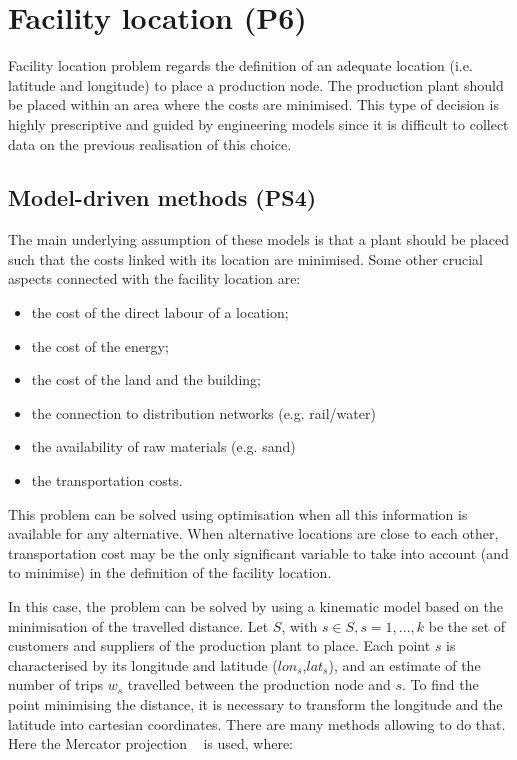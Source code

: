 \section{Facility location (P6)} \label{secFacilityLocationProd}
Facility location problem regards the definition of an adequate location (i.e. latitude and longitude) to place a production node. The production plant should be placed within an area where the costs are minimised. This type of decision is highly prescriptive and guided by engineering models since it is difficult to collect data on the previous realisation of this choice.

\subsection{Model-driven methods (PS4)}
The main underlying assumption of these models is that a plant should be placed such that the costs linked with its location are minimised. Some other crucial aspects connected with the facility location are:

\begin{itemize}
    \item the cost of the direct labour of a location;
    \item the cost of the energy;
    \item the cost of the land and the building;
    \item the connection to distribution networks (e.g. rail/water)
    \item the availability of raw materials (e.g. sand)
    \item the transportation costs.

\end{itemize}

This problem can be solved using optimisation when all this information is available for any alternative. When alternative locations are close to each other, transportation cost may be the only significant variable to take into account (and to minimise) in the definition of the facility location.\par

In this case, the problem can be solved by using a kinematic model based on the minimisation of the travelled distance. Let $S$, with $s\in S, s=1,...,k$ be the set of customers and suppliers of the production plant to place. Each point $s$ is characterised by its longitude and latitude ($lon_s$,$lat_s$), and an estimate of the number of trips $w_s$ travelled between the production node and $s$. To find the point minimising the distance, it is necessary to transform the longitude and the latitude into cartesian coordinates. There are many methods allowing to do that. Here the Mercator projection ~\cite{Snyder1978} is used, where:

